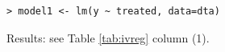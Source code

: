 \documentclass[a4paper]{article}
\begin{document}

\subsection{}

\begin{verbatim}
> model1 <- lm(y ~ treated, data=dta)
\end{verbatim}

Results: see Table \ref{tab:ivreg} column (1).
\end{document}
